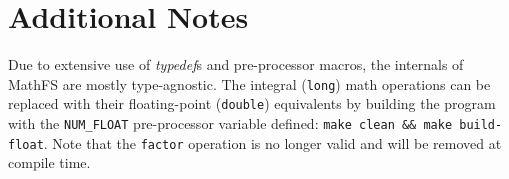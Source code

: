 \documentclass[10pt]{article}
\begin{document}
\section{Additional Notes}
Due to extensive use of \textit{typedef}s and pre-processor macros, the
internals of MathFS are mostly type-agnostic. The integral (\texttt{long})
math operations can be replaced with their floating-point
(\texttt{double}) equivalents by building the program with the
\texttt{NUM\_FLOAT} pre-processor variable defined: \texttt{make clean
\&\& make build-float}. Note that the \texttt{factor} operation is no
longer valid and will be removed at compile time.
\end{document}

